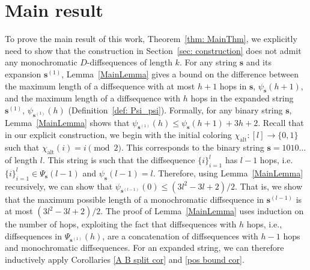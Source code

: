 \documentclass[10pt,a4paper]{amsart}
\def\mod{\!\pmod}
\begin{document}




\section{Main result}\label{MainResult}
To prove the main result of this work, Theorem~\ref{thm: MainThm}, we explicitly need to show that the construction in Section~\ref{sec: construction} does not admit any monochromatic $D$-diffsequences of length $k$. For any string $\mathbf{s}$ and its expansion $\mathbf{s}^{(1)}$, Lemma~\ref{MainLemma} gives a bound on the difference between the maximum length of a diffsequence with at most $h+1$ hops in $\mathbf{s}$, $\psi_{\mathbf{s}}(h+1)$, and the
maximum length of a diffsequence with $h$ hops in the expanded string $\mathbf{s}^{(1)}$, $\psi_{\mathbf{s}^{(1)}}(h)$ (Definition~\ref{def: Psi_psi}). Formally, for any binary string $\mathbf{s}$, Lemma~\ref{MainLemma} shows that $\psi_{\mathbf{s}^{(1)}}(h) \le \psi_{\mathbf{s}}(h+1) + 3h + 2$. Recall that in our explicit construction, we begin with the initial coloring $\chi_{\text{alt}} \colon [l] \to \{0,1\}$ such that $\chi_\text{alt}(i) = i \mod{2}$. This corresponds to the binary string $\mathbf{s} = 1010 \ldots$ of length $l$. This string is such that the diffsequence $\{i\}_{i=1}^{l}$ has $l-1$ hops, i.e. $\{i\}_{i=1}^{l} \in \Psi_{\mathbf{s}}(l-1)$ and $\psi_{\mathbf{s}}(l-1) = l$. Therefore, using Lemma~\ref{MainLemma} recursively, we can show that $\psi_{\mathbf{s}^{(l-1)}}(0) \le (3l^2-3l+2)/2$. That is, we show that the maximum possible length of a monochromatic diffsequence in $\mathbf{s}^{(l-1)}$ is at most $(3l^2-3l+2)/2$. The proof of Lemma~\ref{MainLemma} uses induction on the number of hops, exploiting the fact that diffsequences with $h$ hops, i.e., diffsequences in $\Psi_{\mathbf{s}^{(1)}}(h)$, are a concatenation of diffsequences with $h-1$ hops and monochromatic diffsequences. For an expanded string, we can therefore inductively apply Corollaries \ref{A B split cor} and \ref{pos bound cor}.

\end{document}
